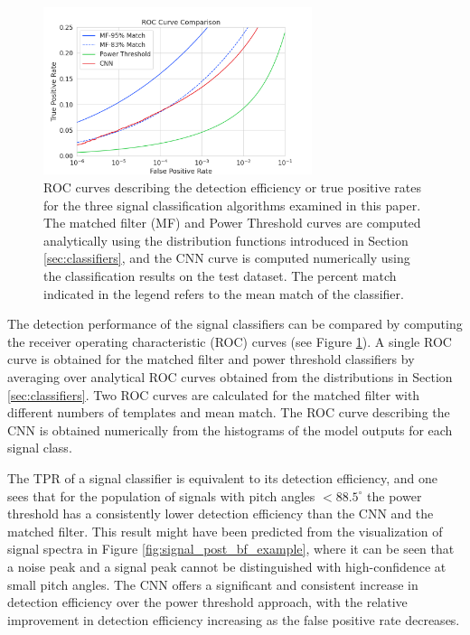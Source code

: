 \begin{figure}[htbp]
    \centering
    \includegraphics[width=0.7\textwidth]{figs/Chapter-4/230327_nn_roc_vs_mf_vs_fft.png}
    \caption{ROC curves describing the detection efficiency or true positive rates for the three signal classification algorithms examined in this paper. The matched filter (MF) and Power Threshold curves are computed analytically using the distribution functions introduced in Section \ref{sec:classifiers}, and the CNN curve is computed numerically using the classification results on the test dataset. The percent match indicated in the legend refers to the mean match of the classifier.
    }
    \label{fig:roc_compare}
\end{figure}
The detection performance of the signal classifiers can be compared by computing the receiver operating characteristic (ROC) curves (see Figure \ref{fig:roc_compare}).
A single ROC curve is obtained for the matched filter and power threshold classifiers by averaging over analytical ROC curves obtained from the distributions in Section \ref{sec:classifiers}. Two ROC curves are calculated for the matched filter with different numbers of templates and mean match. The ROC curve describing the CNN is obtained numerically from the histograms of the model outputs for each signal class.

The TPR of a signal classifier is equivalent to its detection efficiency, and one sees that for the population of signals with pitch angles $<88.5^\circ$ the power threshold has a consistently lower detection efficiency than the CNN and the matched filter. This result might have been predicted from the visualization of signal spectra in Figure \ref{fig:signal_post_bf_example}, where it can be seen that a noise peak and a signal peak cannot be distinguished with high-confidence at small pitch angles. The CNN offers a significant and consistent increase in detection efficiency over the power threshold approach, with the relative improvement in detection efficiency increasing as the false positive rate decreases. 

